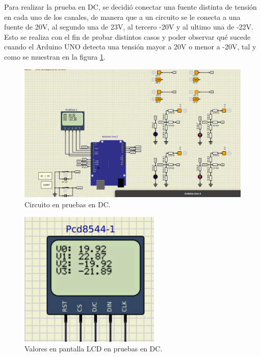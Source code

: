 Para realizar la prueba en DC, se decidió conectar una fuente distinta de tensión en cada uno de los canales, de manera que a un circuito se le conecta a una fuente de 20V, al segundo una de 23V, al tercero -20V y al ultimo una de -22V. Esto se realiza con el fin de probar distintos casos y poder observar qué sucede cuando el Arduino UNO detecta una tensión mayor a 20V o menor a -20V, tal y como se muestran en la figura \ref{FuncaionamientoDC}.

\begin{figure}[H]
    \centering
    \includegraphics[width=\textwidth]{Imagenes/Funcionamiento_DC.png}
    \caption{Circuito en pruebas en DC.}
    \label{FuncaionamientoDC}
\end{figure}

\begin{figure}[H]
    \centering
    \includegraphics[width=0.6\textwidth]{Imagenes/Valores_pantallaLCD.png}
    \caption{Valores en pantalla LCD en pruebas en DC.}
    \label{PantallaLCD}
\end{figure}


